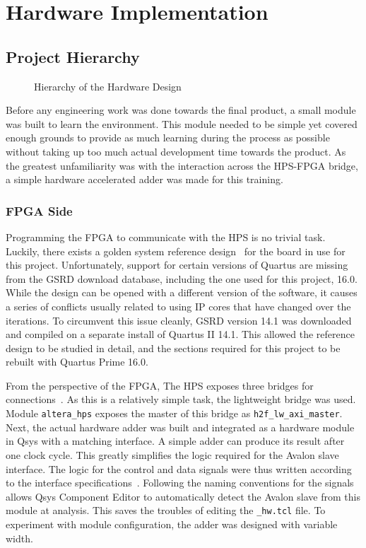 \section{Hardware Implementation}

\subsection{Project Hierarchy}

\begin{figure}[H]
  \centering
  
  \caption{Hierarchy of the Hardware Design}
  \label{Hierarchy}
\end{figure}

Before any engineering work was done towards the final product, a small module was built to learn the environment.
This module needed to be simple yet covered enough grounds to provide as much learning during the process as possible without taking up too much actual development time towards the product.
As the greatest unfamiliarity was with the interaction across the HPS-FPGA bridge, a simple hardware accelerated adder was made for this training.

\subsubsection{FPGA Side}
Programming the FPGA to communicate with the HPS is no trivial task.
Luckily, there exists a golden system reference design~\cite{Rocket1} for the board in use for this project.
Unfortunately, support for certain versions of Quartus are missing from the GSRD download database, including the one used for this project, 16.0.
While the design can be opened with a different version of the software, it causes a series of conflicts usually related to using IP cores that have changed over the iterations.
To circumvent this issue cleanly, GSRD version 14.1 was downloaded and compiled on a separate install of Quartus II 14.1.
This allowed the reference design to be studied in detail, and the sections required for this project to be rebuilt with Quartus Prime 16.0.

From the perspective of the FPGA, The HPS exposes three bridges for connections~\cite{Altera6}.
As this is a relatively simple task, the lightweight bridge was used.
Module \texttt{altera\_hps} exposes the master of this bridge as
\texttt{h2f\_lw\_axi\_master}.
Next, the actual hardware adder was built and integrated as a hardware module in Qsys with a matching interface.
A simple adder can produce its result after one clock cycle.
This greatly simplifies the logic required for the Avalon slave interface.
The logic for the control and data signals were thus written according to the interface specifications~\cite{Intel3}.
Following the naming conventions for the signals allows Qsys Component Editor to automatically detect the Avalon slave from this module at analysis.
This saves the troubles of editing the \texttt{\_hw.tcl} file.
To experiment with module configuration, the adder was designed with variable width.

